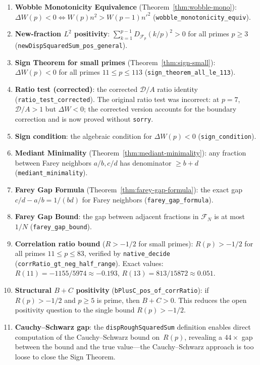 \documentclass[11pt]{article}
\theoremstyle{definition}
\newcommand{\F}{\mathcal{F}}
\begin{document}
\begin{enumerate}
    (Theorem~\ref{thm:geometric-bc}):
    $B + C = (1/{n'}^2)(\sum(D+\delta)^2 - \sum D^2)$
    (\texttt{bPlusC\_eq\_new\_minus\_old\_sq}).
  \item \textbf{Wobble Monotonicity Equivalence}
    (Theorem~\ref{thm:wobble-mono}):
    $\Delta W(p) < 0 \Leftrightarrow W(p) n^2 > W(p-1) {n'}^2$
    (\texttt{wobble\_monotonicity\_equiv}).
  \item \textbf{New-fraction $L^2$ positivity}:
    $\sum_{k=1}^{p-1} D_{\F_p}(k/p)^2 > 0$ for all primes
    $p \ge 3$ (\texttt{newDispSquaredSum\_pos\_general}).
  \item \textbf{Sign Theorem for small primes}
    (Theorem~\ref{thm:sign-small}):
    $\Delta W(p) < 0$ for all primes $11 \le p \le 113$
    (\texttt{sign\_theorem\_all\_le\_113}).
  \item \textbf{Ratio test (corrected)}:
    the corrected $\mathcal{D}/A$ ratio identity
    (\texttt{ratio\_test\_corrected}).  The original ratio test
    was incorrect: at $p = 7$, $\mathcal{D}/A > 1$ but
    $\Delta W < 0$; the corrected version accounts for the
    boundary correction and is now proved without \texttt{sorry}.
  \item \textbf{Sign condition}:
    the algebraic condition for $\Delta W(p) < 0$
    (\texttt{sign\_condition}).
  \item \textbf{Mediant Minimality}
    (Theorem~\ref{thm:mediant-minimality}):
    any fraction between Farey neighbors $a/b, c/d$ has
    denominator $\ge b + d$
    (\texttt{mediant\_minimality}).
  \item \textbf{Farey Gap Formula}
    (Theorem~\ref{thm:farey-gap-formula}):
    the exact gap $c/d - a/b = 1/(bd)$ for Farey neighbors
    (\texttt{farey\_gap\_formula}).
  \item \textbf{Farey Gap Bound}:
    the gap between adjacent fractions in $\F_N$ is at most
    $1/N$ (\texttt{farey\_gap\_bound}).
  \item \textbf{Correlation ratio bound} ($R > -1/2$ for small primes):
    $R(p) > -1/2$ for all primes $11 \le p \le 83$, verified by
    \texttt{native\_decide} (\texttt{corrRatio\_gt\_neg\_half\_range}).
    Exact values: $R(11) = -1155/5974 \approx -0.193$,
    $R(13) = 813/15872 \approx 0.051$.
  \item \textbf{Structural $B+C$ positivity}
    (\texttt{bPlusC\_pos\_of\_corrRatio}):
    if $R(p) > -1/2$ and $p \ge 5$ is prime, then $B + C > 0$.
    This reduces the open positivity question to the single bound
    $R(p) > -1/2$.
  \item \textbf{Cauchy--Schwarz gap}:
    the \texttt{dispRoughSquaredSum} definition enables direct
    computation of the Cauchy--Schwarz bound on~$R(p)$, revealing
    a $44\times$ gap between the bound and the true value---the
    Cauchy--Schwarz approach is too loose to close the Sign Theorem.
\end{enumerate}
\end{document}
